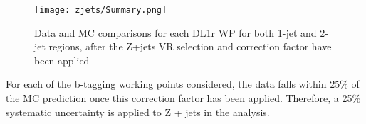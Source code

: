                                                                                                                              
\begin{figure}[H]                                                                                                        
   \centering
   \texttt{[image: zjets/Summary.png]}
   \caption{Data and MC comparisons for each DL1r WP for both 1-jet and 2-jet regions, after the Z+jets VR selection and correction factor have been applied}                                                                                             
   \label{fig:zjets_summary}
\end{figure}

For each of the b-tagging working points considered, the data falls within 25\% of the MC prediction once this correction factor has been applied. Therefore, a 25\% systematic uncertainty is applied to Z + jets in the analysis.

